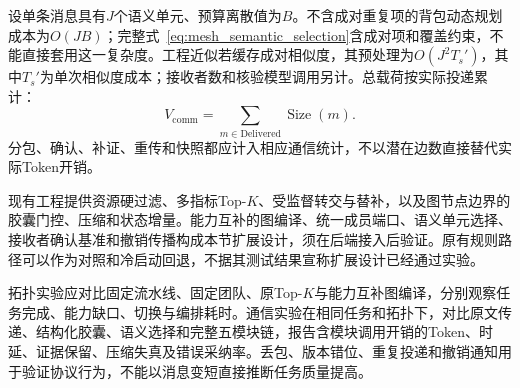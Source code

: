 设单条消息具有$J$个语义单元、预算离散值为$B$。不含成对重复项的背包动态规划成本为$O(JB)$；完整式~\eqref{eq:mesh_semantic_selection}含成对项和覆盖约束，不能直接套用这一复杂度。工程近似若缓存成对相似度，其预处理为$O(J^2T_s')$，其中$T_s'$为单次相似度成本；接收者数和核验模型调用另计。总载荷按实际投递累计：
\begin{equation}
V_{\mathrm{comm}}=\sum_{m\in\mathrm{Delivered}}
\operatorname{Size}(m).
\end{equation}
分包、确认、补证、重传和快照都应计入相应通信统计，不以潜在边数直接替代实际Token开销。

现有工程提供资源硬过滤、多指标Top-$K$、受监督转交与替补，以及图节点边界的胶囊门控、压缩和状态增量。能力互补的图编译、统一成员端口、语义单元选择、接收者确认基准和撤销传播构成本节扩展设计，须在后端接入后验证。原有规则路径可以作为对照和冷启动回退，不据其测试结果宣称扩展设计已经通过实验。

拓扑实验应对比固定流水线、固定团队、原Top-$K$与能力互补图编译，分别观察任务完成、能力缺口、切换与编排耗时。通信实验在相同任务和拓扑下，对比原文传递、结构化胶囊、语义选择和完整五模块链，报告含模块调用开销的Token、时延、证据保留、压缩失真及错误采纳率。丢包、版本错位、重复投递和撤销通知用于验证协议行为，不能以消息变短直接推断任务质量提高。

